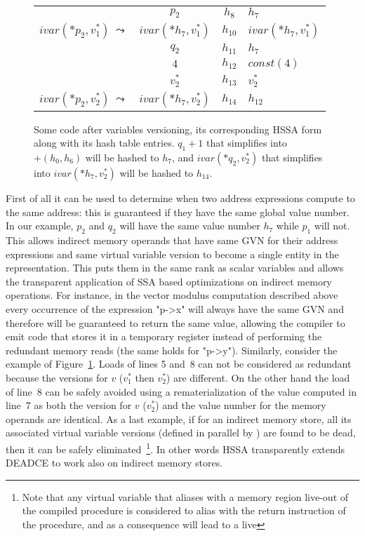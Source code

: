 \begin{figure}
\begin{center}
{\begin{tabular}{rc|c|l}
    &$p_2$                 & $h_8$   & $h_7$\\
    $ivar(*p_2,v^*_1)\ \leadsto$& $ivar(*h_7,v^*_1)$      & $h_{10}$ &$ivar(*h_7,v^*_1)$\\
    &$q_2$                 & $h_{11}$ & $h_7$\\
    &$4$                   & $h_{12}$ & $const(4)$\\
    &$v^*_2$               & $h_{13}$   &  $v^*_2$\\
    $ivar(*p_2,v^*_2)\ \leadsto$& $ivar(*h_7,v^*_2)$      & $h_{14}$ &$h_{12}$\\
  \end{tabular}
}
\end{center}
\caption{\label{fig:hssa:versioning}Some code after variables versioning, its corresponding HSSA form along with its hash table entries. $q_1+1$ that simplifies into $ +(h_0,h_6)$ will be hashed to $h_7$, and $ivar(*q_2,v^*_2)$ that simplifies into $ivar(*h_7,v^*_2)$ will be hashed to $h_{14}$.
}
\end{figure}

First of all it can be used to determine when two address expressions compute to the same address: this is guaranteed if they have the same global value number. In our example, $p_2$ and $q_2$ will have the same value number $h_7$ while $p_1$ will not.
This allows indirect memory operands that have same GVN for their address expressions and same virtual variable version to become a single entity in the representation. This puts them in the same rank as scalar variables and allows the transparent application of SSA based optimizations on indirect memory operations.
For instance, in the vector modulus computation described above every occurrence of the expression "p-\textgreater x" will always have the same GVN and therefore will be guaranteed to return the same value, allowing the compiler to emit code that stores it in a temporary register instead of performing the redundant memory reads (the same holds for "p-\textgreater y").
Similarly, consider the example of Figure~\ref{fig:hssa:versioning}. Loads of lines 5 and~8 can not be considered as redundant because the versions for $v$ ($v_1^*$ then $v_2^*$) are different. On the other hand the load of line~8 can be safely avoided using a rematerialization of the value computed in line~7 as both the version for $v$ ($v_2^*$) and the value number for the memory operands are identical. 
As a last example, if for an indirect memory store, all its associated virtual variable versions (defined in parallel by \chifuns) are found to be dead, then it can be safely eliminated~\footnote{Note that any virtual variable that aliases with a memory region live-out of the compiled procedure is considered to alias with the return instruction of the procedure, and as a consequence will lead to a live \mufun}. In other words HSSA transparently extends DEADCE to work also on indirect memory stores.

